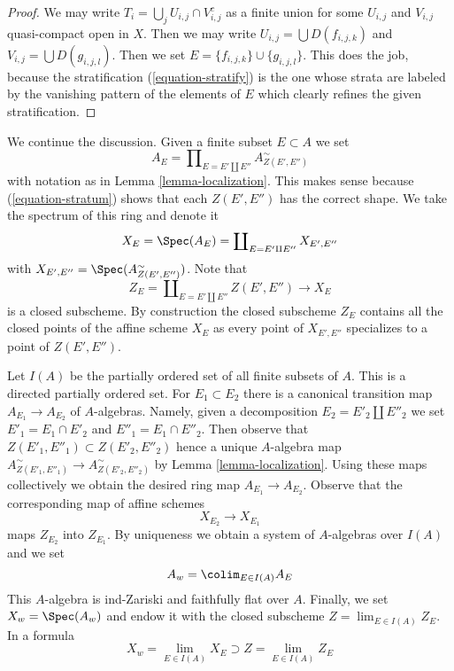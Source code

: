\begin{proof}
We may write $T_i = \bigcup_j U_{i, j} \cap V_{i, j}^c$ as a finite union
for some $U_{i, j}$ and $V_{i, j}$ quasi-compact open in $X$.
Then we may write $U_{i, j} = \bigcup D(f_{i, j, k})$ and
$V_{i, j} = \bigcup D(g_{i, j, l})$. Then we set
$E = \{f_{i, j, k}\} \cup \{g_{i, j, l}\}$. This does the job, because
the stratification (\ref{equation-stratify}) is the one whose strata are
labeled by the vanishing pattern of the elements of $E$ which
clearly refines the given stratification.
\end{proof}

\noindent
We continue the discussion.
Given a finite subset $E \subset A$ we set
\begin{equation}
\label{equation-ring}
A_E = \prod\nolimits_{E = E' \amalg E''} A_{Z(E', E'')}^\sim
\end{equation}
with notation as in Lemma \ref{lemma-localization}. This makes sense because
(\ref{equation-stratum}) shows that each $Z(E', E'')$ has the correct shape.
We take the spectrum of this ring and denote it
\begin{equation}
\label{equation-spectrum}
X_E = \Spec(A_E) = \coprod\nolimits_{E = E' \amalg E''} X_{E', E''}
\end{equation}
with $X_{E', E''} = \Spec(A_{Z(E', E'')}^\sim)$. Note that
\begin{equation}
\label{equation-closed}
Z_E = \coprod\nolimits_{E = E' \amalg E''} Z(E', E'')
\longrightarrow
X_E
\end{equation}
is a closed subscheme. By construction the closed subscheme $Z_E$
contains all the closed points of the affine scheme $X_E$ as every point
of $X_{E', E''}$ specializes to a point of $Z(E', E'')$.

\medskip\noindent
Let $I(A)$ be the partially ordered set of all finite subsets of $A$.
This is a directed partially ordered set. For $E_1 \subset E_2$ there
is a canonical transition map $A_{E_1} \to A_{E_2}$ of $A$-algebras.
Namely, given a decomposition $E_2 = E'_2 \amalg E''_2$ we set
$E'_1 = E_1 \cap E'_2$ and $E''_1 = E_1 \cap E''_2$. Then observe that
$Z(E'_1, E''_1) \subset Z(E'_2, E''_2)$ hence a unique $A$-algebra map
$A_{Z(E'_1, E''_1)}^\sim \to A_{Z(E'_2, E''_2)}^\sim$ by
Lemma \ref{lemma-localization}. Using these maps collectively we obtain
the desired ring map $A_{E_1} \to A_{E_2}$. Observe that the corresponding
map of affine schemes
\begin{equation}
\label{equation-transition}
X_{E_2} \longrightarrow X_{E_1}
\end{equation}
maps $Z_{E_2}$ into $Z_{E_1}$. By uniqueness we obtain a system of
$A$-algebras over $I(A)$ and we set
\begin{equation}
\label{equation-colimit-ring}
A_w = \colim_{E \in I(A)} A_E
\end{equation}
This $A$-algebra is ind-Zariski and faithfully flat over $A$.
Finally, we set $X_w = \Spec(A_w)$ and endow it with the closed subscheme
$Z = \lim_{E \in I(A)} Z_E$. In a formula
\begin{equation}
\label{equation-final}
X_w = \lim_{E \in I(A)} X_E \supset Z = \lim_{E \in I(A)} Z_E
\end{equation}

